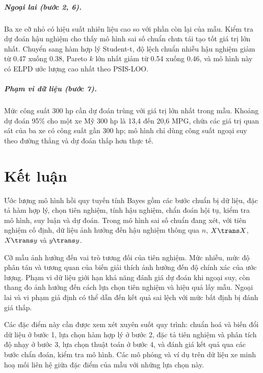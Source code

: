 \documentclass[12pt,a4paper]{report}
\begin{document}
\paragraph{Ngoại lai (bước 2, 6).} Ba xe cỡ nhỏ có hiệu suất nhiên liệu cao so với phần còn lại của mẫu.
Kiểm tra dự đoán hậu nghiệm cho thấy mô hình sai số chuẩn chưa tái tạo tốt giá trị lớn nhất.
Chuyển sang hàm hợp lý Student-t, độ lệch chuẩn nhiễu hậu nghiệm giảm từ
\num{0.47} xuống \num{0.38}, Pareto $k$ lớn nhất giảm từ \num{0.54} xuống
\num{0.46}, và mô hình này có ELPD ước lượng cao nhất theo PSIS-LOO.

\paragraph{Phạm vi dữ liệu (bước 7).} Mức công suất 300 hp cần dự đoán trùng với
giá trị lớn nhất trong mẫu. Khoảng dự đoán 95\% cho một xe Mỹ 300 hp là 13{,}4 đến
20{,}6 MPG, chứa các giá trị quan sát của ba xe có công suất gần 300 hp; mô hình chỉ dùng công suất ngoại suy
theo đường thẳng và dự đoán thấp hơn thực tế.

\chapter{Kết luận}
\label{sec:conclusion}

Ước lượng mô hình hồi quy tuyến tính Bayes gồm các bước chuẩn bị dữ liệu,
đặc tả hàm hợp lý, chọn tiên nghiệm, tính hậu nghiệm, chẩn đoán hội tụ, kiểm tra
mô hình, suy luận và dự đoán. Trong mô hình sai số chuẩn đang xét, với tiên
nghiệm cố định, dữ liệu ảnh hưởng đến hậu nghiệm thông qua $n$, $X\trans X$,
$X\trans y$ và $y\trans y$.

Cỡ mẫu ảnh hưởng đến vai trò tương đối của tiên nghiệm. Mức nhiễu, mức độ phân
tán và tương quan của biến giải thích ảnh hưởng đến độ chính xác của ước lượng.
Phạm vi dữ liệu giới hạn khả năng đánh giá dự đoán khi ngoại suy, còn thang đo
ảnh hưởng đến cách lựa chọn tiên nghiệm và hiệu quả lấy mẫu. Ngoại lai và vi
phạm giả định có thể dẫn đến kết quả sai lệch với mức bất định bị đánh giá thấp.

Các đặc điểm này cần được xem xét xuyên suốt quy trình: chuẩn hoá và biến đổi
dữ liệu ở bước 1, lựa chọn hàm hợp lý ở bước 2, đặc tả tiên nghiệm và phân tích
độ nhạy ở bước 3, lựa chọn thuật toán ở bước 4, và đánh giá kết quả qua các bước
chẩn đoán, kiểm tra mô hình. Các mô phỏng và ví dụ trên dữ liệu xe minh hoạ mối
liên hệ giữa đặc điểm của mẫu với những lựa chọn này.
\end{document}
